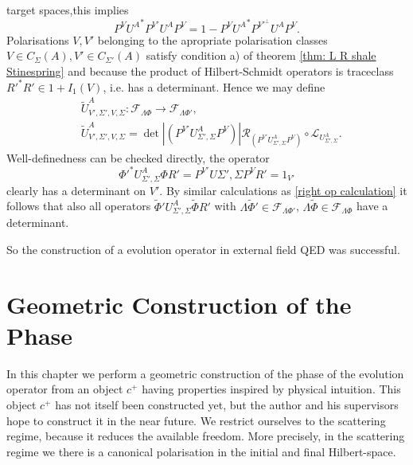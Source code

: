 \documentclass[b5paper,draft,openbib,12pt]{memoir}
\begin{document}
target spaces,this implies 
\begin{equation}
  P^V {U^A}^* P^{V'}U^A P^V = 1- P^{V}{U^A}^* P^{{V'}^\perp} U^A P^{V}.
\end{equation}
Polarisations \(V,V'\) belonging to the apropriate polarisation 
classes \(V\in C_\Sigma(A), V'\in C_{\Sigma'}(A)\) satisfy
condition a) of 
theorem \ref{thm: L R shale Stinespring} and because 
the product of Hilbert-Schmidt operators is traceclass
 \({R'}^*R'\in 1 +I_1(V)\), i.e.
has a determinant. Hence we may define 
\begin{align}
  &\tilde{U}^A_{V',\Sigma',V,\Sigma}:\mathcal{F}_{\mathsf{\Lambda}\Phi}\rightarrow \mathcal{F}_{\mathsf{\Lambda}\Phi'},\\
  &\tilde{U}^A_{V',\Sigma',V,\Sigma}=\det|(P^{V'} U^A_{\Sigma',\Sigma} P^V)| \mathcal{R}_{(P^{V'} U^A_{\Sigma',\Sigma} P^V)} \circ \mathcal{L}_{U^A_{\Sigma',\Sigma}}.
\end{align}
Well-definedness can be checked directly, the operator
\begin{equation}
  {\Phi'}^* U^A_{\Sigma',\Sigma} \Phi R' 
  =P^{V'} U{\Sigma',\Sigma} P^{V}R' 
  = 1_{V'}
\end{equation}
clearly has a determinant on \(V'\). By similar 
calculations as \eqref{right op calculation} 
it follows that also all operators 
\(\tilde{\Phi}'U^A_{\Sigma',\Sigma} \tilde{\Phi}R'\)
with \(\mathsf{\Lambda}\tilde{\Phi}'\in \mathcal{F}_{\mathsf{\Lambda}\Phi'}\),
\(\mathsf{\Lambda}\tilde{\Phi}\in \mathcal{F}_{\mathsf{\Lambda}\Phi}\)
have a determinant.

So the construction of a evolution operator in external field 
QED was successful.


\section{Geometric Construction of the Phase}\label{chapter geometery}
In this chapter we perform a geometric construction of the phase 
of the evolution operator from an object \(c^+\) having properties 
inspired by physical intuition. This object \(c^+\) has not 
itself been constructed yet, but the author and his supervisors 
hope to construct it in the near future. 
We restrict ourselves to the scattering regime, because it reduces 
the available freedom. More precisely, in the scattering regime we 
there is a canonical polarisation in the initial and final Hilbert-space.
\end{document}
